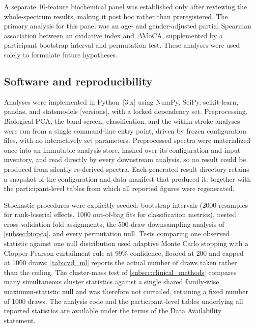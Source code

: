 \documentclass[preprint,12pt]{elsarticle}
\begin{document}
A separate 10-feature biochemical panel was established only after reviewing the whole-spectrum results, making it post hoc rather than preregistered. The primary analysis for this panel was an age- and gender-adjusted partial Spearman association between an oxidative index and $\Delta$MoCA, supplemented by a participant bootstrap interval and permutation test. These analyses were used solely to formulate future hypotheses.

\subsection{Software and reproducibility}
\label{subsec:software}

Analyses were implemented in Python~{\color{red}[3.x]} using NumPy, SciPy, scikit-learn, pandas, and statsmodels {\color{red}[versions]}, with a locked dependency set. Preprocessing, Biological PCA, the band screen, classification, and the within-stroke analyses were run from a single command-line entry point, driven by frozen configuration files, with no interactively set parameters. Preprocessed spectra were materialized once into an immutable analysis store, hashed over its configuration and input inventory, and read directly by every downstream analysis, so no result could be produced from silently re-derived spectra. Each generated result directory retains a snapshot of the configuration and data manifest that produced it, together with the participant-level tables from which all reported figures were regenerated.

Stochastic procedures were explicitly seeded: bootstrap intervals (2000 resamples for rank-biserial effects, 1000 out-of-bag fits for classification metrics), nested cross-validation fold assignments, the 500-draw downsampling analysis of \cref{subsec:biopca}, and every permutation null. Tests comparing one observed statistic against one null distribution used adaptive Monte Carlo stopping with a Clopper-Pearson curtailment rule \cite{besag1991} at 99\% confidence, floored at 200 and capped at 1000 draws; \cref{tab:cvd_ml} reports the actual number of draws taken rather than the ceiling. The cluster-mass test of \cref{subsec:clinical_methods} compares many simultaneous cluster statistics against a single shared family-wise maximum-statistic null and was therefore not curtailed, retaining a fixed number of 1000 draws. The analysis code and the participant-level tables underlying all reported statistics are available under the terms of the Data Availability statement.
\end{document}
